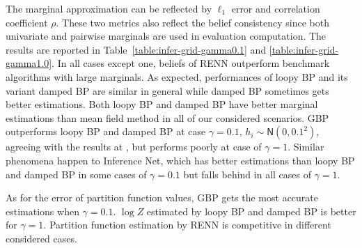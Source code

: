 \begin{sidewaystable}[ph!]
\begin{center}
\begin{small}
\begin{tabular}{lcccccccc}



        

        \bottomrule
      \end{tabular}
    \end{small}
  \end{center}
\end{sidewaystable}

The marginal approximation can be reflected by $\ell_1$ error and correlation coefficient $\rho$. These two metrics also reflect the belief consistency since both univariate and pairwise marginals are used in evaluation computation. The results are reported in Table~\ref{table:infer-grid-gamma0.1} and \ref{table:infer-grid-gamma1.0}. In all cases except one, beliefs of RENN outperform benchmark algorithms with large marginals. As expected, performances of loopy BP and its variant damped BP are similar in general while damped BP sometimes gets better estimations. Both loopy BP and damped BP have better marginal estimations than mean field method in all of our considered scenarios. GBP outperforms loopy BP and damped BP at case $\gamma=0.1$, $h_i\sim \mathsf{N}(0,0.1^2)$, agreeing with the results at \cite{yedida2005constucting}, but performs poorly at case of $\gamma=1$. Similar phenomena happen to Inference Net, which has better estimations than loopy BP and damped BP in some cases of $\gamma=0.1$ but falls behind in all cases of $\gamma=1$.


As for the error of partition function values, GBP gets the most accurate estimations when $\gamma=0.1$. $\log{Z}$ estimated by loopy BP and damped BP is better for $\gamma=1$. Partition function estimation by RENN is competitive in different considered cases.

